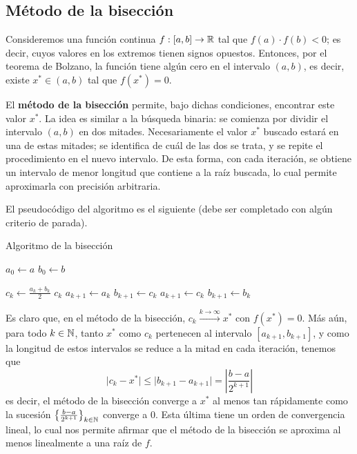 \subsection{Método de la bisección}

Consideremos una función continua $f : [a,b] \to \mathbb{R}$ tal que $f(a) \cdot
f(b) < 0$; es decir, cuyos valores en los extremos tienen signos opuestos.
Entonces, por el teorema de Bolzano, la función tiene algún cero en el
intervalo $(a,b)$, es decir, existe $x^\ast \in (a,b)$ tal que $f(x^\ast) = 0$.

El \textbf{método de la bisección} permite, bajo dichas condiciones,
encontrar este valor $x^\ast$. La idea es similar a la búsqueda binaria: se
comienza por dividir el intervalo $(a,b)$ en dos mitades. Necesariamente
el valor $x^\ast$ buscado estará en una de estas mitades; se identifica de cuál
de las dos se trata, y se repite el procedimiento en el nuevo intervalo.
De esta forma, con cada iteración, se obtiene un intervalo de menor longitud
que contiene a la raíz buscada, lo cual permite aproximarla con precisión
arbitraria.

El pseudocódigo del algoritmo es el siguiente (debe ser completado con algún
criterio de parada).

\begin{algorithm}[H]
\caption{Algoritmo de la bisección}
\label{algo:biseccion}


$a_0 \gets a$ \;
$b_0 \gets b$ \;

 {
    $c_k \gets \frac{a_k + b_k}{2}$ \;
     {
        \Return $c_k$ \;
    }
     {
        $a_{k+1} \gets a_k$ \;
        $b_{k+1} \gets c_k$ \;
    }
    {
        $a_{k+1} \gets c_k$ \;
        $b_{k+1} \gets b_k$ \;
    }
}

\end{algorithm}

Es claro que, en el método de la bisección, $c_k \xrightarrow{k \to \infty}
x^\ast$ con $f(x^\ast) = 0$. Más aún, para todo $k \in \mathbb{N}$, tanto $x^\ast$
como $c_k$ pertenecen al intervalo $[a_{k+1}, b_{k+1}]$, y como la longitud de
estos intervalos se reduce a la mitad en cada iteración, tenemos que
\[ \lvert c_k - x^\ast \rvert \leq \lvert b_{k+1} - a_{k+1} \rvert =
    \left\lvert \frac{b - a}{2^{k+1}} \right\rvert \]
es decir, el método de la bisección converge a $x^\ast$ al menos tan
rápidamente como la sucesión $\left\lbrace \frac{b - a}{2^{k+1}}
\right\rbrace_{k \in \mathbb{N}}$ converge a $0$. Esta última tiene un
orden de convergencia lineal, lo cual nos permite afirmar que el método de la
bisección se aproxima al menos linealmente a una raíz de $f$.

